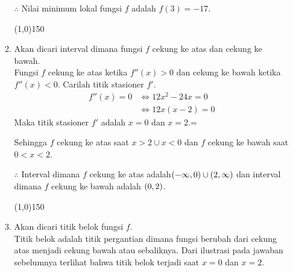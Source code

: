 \begin{enumerate}[leftmargin=*, label={\arabic*}.]
\begin{enumerate}[label={\alph*}.]
    $\therefore$ Nilai minimum lokal fungsi $f$ adalah $f(3)=-17$.
\begin{center}
    \line(1,0){150}
\end{center}
    \item Akan dicari interval dimana fungsi $f$ cekung ke atas dan cekung ke bawah.\\
    Fungsi $f$ cekung ke atas ketika $f''(x) > 0$ dan cekung ke bawah ketika $f''(x)<0.$
    Carilah titik stasioner $f'$.
    \begin{align*}
        f''(x)=0 &\iff 12x^{2}-24x=0\\
        &\iff 12x(x-2) = 0
    \end{align*}
    Maka titik stasioner $f'$ adalah $x=0$ dan $x=2$.=
    \begin{center}
    \end{center}
    Sehingga $f$ cekung ke atas saat $x > 2 \cup x < 0$ dan $f$ cekung ke bawah saat 
    $0 < x < 2$.

    $\therefore$ Interval dimana $f$ cekung ke atas adalah$(-\infty,0)\cup(2,\infty)$ 
    dan interval dimana $f$ cekung ke bawah adalah $(0,2)$.
\begin{center}
    \line(1,0){150}
\end{center}
    \item Akan dicari titik belok fungsi $f$.\\
    Titik belok adalah titik pergantian dimana fungsi berubah dari cekung atas menjadi cekung bawah 
    atau sebaliknya. Dari ilustrasi pada jawaban sebelumnya terlihat bahwa titik belok terjadi saat 
    $x=0$ dan $x=2$.


\end{enumerate}
\end{enumerate}
